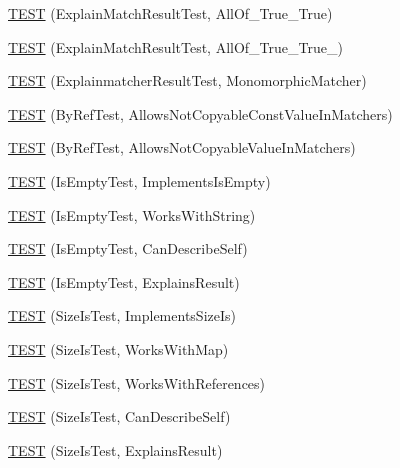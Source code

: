 \begin{DoxyCompactItemize}
\item 
\hyperlink{namespacetesting_1_1gmock__matchers__test_a16545b298640b253502d604f52ea95e2}{T\+E\+ST} (Explain\+Match\+Result\+Test, All\+Of\+\_\+\+True\+\_\+\+True)
\item 
\hyperlink{namespacetesting_1_1gmock__matchers__test_af1ba4010a24716a51a302f9a518023b5}{T\+E\+ST} (Explain\+Match\+Result\+Test, All\+Of\+\_\+\+True\+\_\+\+True\+\_)
\item 
\hyperlink{namespacetesting_1_1gmock__matchers__test_a102b10d9064f6e0037e3f3f0c3e76e22}{T\+E\+ST} (Explainmatcher\+Result\+Test, Monomorphic\+Matcher)
\item 
\hyperlink{namespacetesting_1_1gmock__matchers__test_aab82f120c70dc7d8bc2fd74ac6897486}{T\+E\+ST} (By\+Ref\+Test, Allows\+Not\+Copyable\+Const\+Value\+In\+Matchers)
\item 
\hyperlink{namespacetesting_1_1gmock__matchers__test_a5ed7b822889a34f018c2ba8f21941fd4}{T\+E\+ST} (By\+Ref\+Test, Allows\+Not\+Copyable\+Value\+In\+Matchers)
\item 
\hyperlink{namespacetesting_1_1gmock__matchers__test_ab63796f77c7572f6f1aef01cb140f99e}{T\+E\+ST} (Is\+Empty\+Test, Implements\+Is\+Empty)
\item 
\hyperlink{namespacetesting_1_1gmock__matchers__test_a22f0cacccee169b7390741b9815f4281}{T\+E\+ST} (Is\+Empty\+Test, Works\+With\+String)
\item 
\hyperlink{namespacetesting_1_1gmock__matchers__test_adcf3743190f973f2773296d0772e8950}{T\+E\+ST} (Is\+Empty\+Test, Can\+Describe\+Self)
\item 
\hyperlink{namespacetesting_1_1gmock__matchers__test_a1c168c284000d05d63bf5e9df10d1b7c}{T\+E\+ST} (Is\+Empty\+Test, Explains\+Result)
\item 
\hyperlink{namespacetesting_1_1gmock__matchers__test_abe619d5d1910e1f2e8b169622d1d8592}{T\+E\+ST} (Size\+Is\+Test, Implements\+Size\+Is)
\item 
\hyperlink{namespacetesting_1_1gmock__matchers__test_aea77169d6c56b88b5c99273d5a2bc0f2}{T\+E\+ST} (Size\+Is\+Test, Works\+With\+Map)
\item 
\hyperlink{namespacetesting_1_1gmock__matchers__test_a53bcd375786f69d889a8e8891ff8e0b0}{T\+E\+ST} (Size\+Is\+Test, Works\+With\+References)
\item 
\hyperlink{namespacetesting_1_1gmock__matchers__test_adc9720306de1626aa7e523637ca64dfa}{T\+E\+ST} (Size\+Is\+Test, Can\+Describe\+Self)
\item 
\hyperlink{namespacetesting_1_1gmock__matchers__test_a6c218845fd345302c490ef53f0d36995}{T\+E\+ST} (Size\+Is\+Test, Explains\+Result)

\end{DoxyCompactItemize}

